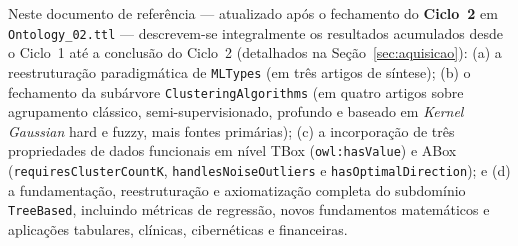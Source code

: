 \documentclass[11pt,a4paper]{article}
\newcommand{\onto}[1]{\texttt{#1}}
\begin{document}
Neste documento de referência --- atualizado após o fechamento do \textbf{Ciclo~2} em \texttt{Ontology\_02.ttl} --- descrevem-se integralmente os resultados acumulados desde o Ciclo~1 até a conclusão do Ciclo~2 (detalhados na Seção~\ref{sec:aquisicao}): (a) a reestruturação paradigmática de \onto{MLTypes} (em três artigos de síntese); (b) o fechamento da subárvore \onto{ClusteringAlgorithms} (em quatro artigos sobre agrupamento clássico, semi-supervisionado, profundo e baseado em \emph{Kernel Gaussian} hard e fuzzy, mais fontes primárias); (c) a incorporação de três propriedades de dados funcionais em nível TBox (\onto{owl:hasValue}) e ABox (\onto{requiresClusterCountK}, \onto{handlesNoiseOutliers} e \onto{hasOptimalDirection}); e (d) a fundamentação, reestruturação e axiomatização completa do subdomínio \onto{TreeBased}, incluindo métricas de regressão, novos fundamentos matemáticos e aplicações tabulares, clínicas, cibernéticas e financeiras.
\end{document}
